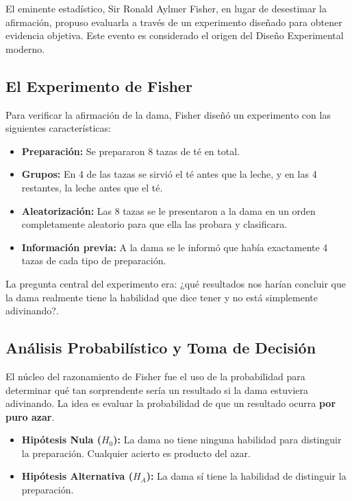 \documentclass[11pt]{article}
\theoremstyle{definition} %
\begin{document}
El eminente estadístico, Sir Ronald Aylmer Fisher, en lugar de desestimar la afirmación, propuso evaluarla a través de un experimento diseñado para obtener evidencia objetiva. Este evento es considerado el origen del Diseño Experimental moderno.

\subsection{El Experimento de Fisher}

Para verificar la afirmación de la dama, Fisher diseñó un experimento con las siguientes características:

\begin{itemize}
    \item \textbf{Preparación:} Se prepararon 8 tazas de té en total.
    \item \textbf{Grupos:} En 4 de las tazas se sirvió el té antes que la leche, y en las 4 restantes, la leche antes que el té.
    \item \textbf{Aleatorización:} Las 8 tazas se le presentaron a la dama en un orden completamente aleatorio para que ella las probara y clasificara.
    \item \textbf{Información previa:} A la dama se le informó que había exactamente 4 tazas de cada tipo de preparación.
\end{itemize}

La pregunta central del experimento era: ¿qué resultados nos harían concluir que la dama realmente tiene la habilidad que dice tener y no está simplemente adivinando?.

\subsection{Análisis Probabilístico y Toma de Decisión}

El núcleo del razonamiento de Fisher fue el uso de la probabilidad para determinar qué tan sorprendente sería un resultado si la dama estuviera adivinando. La idea es evaluar la probabilidad de que un resultado ocurra \textbf{por puro azar}.

\begin{itemize}
    \item \textbf{Hipótesis Nula ($H_0$):} La dama no tiene ninguna habilidad para distinguir la preparación. Cualquier acierto es producto del azar.
    \item \textbf{Hipótesis Alternativa ($H_A$):} La dama sí tiene la habilidad de distinguir la preparación.
\end{itemize}
\end{document}
